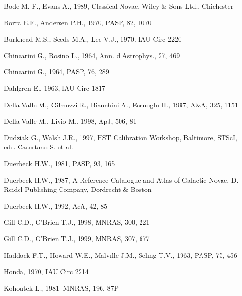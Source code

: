 \begin{thebibliography}{}


 Bode M. F., Evans A., 1989, Classical Novae, Wiley \& Sons Ltd.,
 Chichester

Borra E.F., Andersen P.H., 1970, PASP, 82, 1070

Burkhead M.S., Seeds M.A., Lee V.J., 1970, IAU Circ 2220

Chincarini G., Rosino L., 1964,  Ann. d'Astrophys., 27, 469

Chincarini G., 1964,  PASP, 76, 289

 Dahlgren E., 1963, IAU Circ 1817

Della Valle M., Gilmozzi R., Bianchini A., Esenoglu H., 1997, A\&A, 325, 1151

Della Valle M., Livio M., 1998, ApJ, 506, 81

 Dudziak G., Walsh J.R., 1997, HST Calibration Workshop, Baltimore, 
 STScI, eds. Casertano S. et al.

 Duerbeck H.W., 1981, PASP, 93, 165

 Duerbeck H.W., 1987, A Reference Catalogue and Atlas of Galactic Novae,
 D. Reidel Publishing Company, Dordrecht \& Boston

 Duerbeck H.W., 1992, AcA, 42, 85

 Gill C.D., O'Brien T.J., 1998, MNRAS, 300, 221

 Gill C.D., O'Brien T.J., 1999, MNRAS, 307, 677

Haddock F.T., Howard W.E., Malville J.M., Seling T.V., 1963, PASP, 75, 456

 Honda, 1970, IAU Circ 2214

 Kohoutek L., 1981, MNRAS, 196, 87P


\end{thebibliography}

